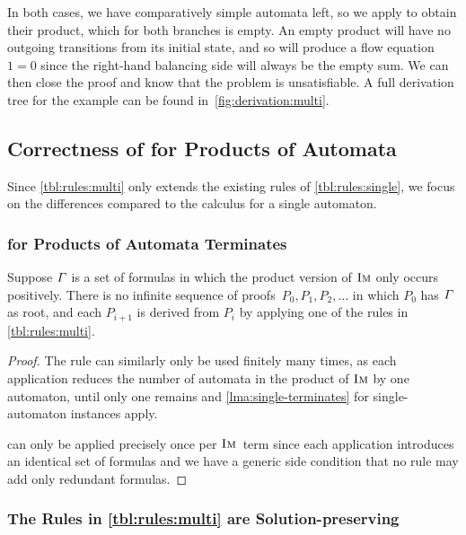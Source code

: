 In both cases, we have comparatively simple automata left, so we apply
\Materialise{} to obtain their product, which for both branches is empty. An
empty product will have no outgoing transitions from its initial state, and so
will produce a flow equation $1 = 0$ since the right-hand balancing side will
always be the empty sum. We can then close the proof and know that the problem
is unsatisfiable. A full derivation tree for the example can be found 
in~\cref{fig:derivation:multi}.


\subsection{Correctness of \Calculus{} for Products of Automata}

Since \cref{tbl:rules:multi} only extends the existing rules of
\cref{tbl:rules:single}, we focus on the differences compared
to the calculus for a single automaton.

\subsubsection{\Calculus{} for Products of Automata Terminates}
\begin{lemma}\label{lma:multi-terminates}
  Suppose $\varGamma{}$ is a set of formulas in which the product
  version of $\operatorname{\textsc{Im}}$ only occurs positively. There is no
  infinite sequence of proofs~$P_0, P_1, P_2, \ldots$ in which $P_0$
  has $\varGamma{}$ as root, and each $P_{i+1}$ is derived from
  $P_i$ by applying one of the rules in \cref{tbl:rules:multi}.
\end{lemma}

\begin{proof}
  The rule \Materialise{} can similarly only be used finitely many times, as
  each application reduces the number of automata in the product of $\operatorname{\textsc{Im}}$ by
  one automaton, until only one remains and \cref{lma:single-terminates} for
  single-automaton instances apply.
  
  \ExpandM{} can only be applied precisely once per $\operatorname{\textsc{Im}}$~term since
  each application introduces an identical set of formulas and we have a generic
  side condition that no rule may add only redundant formulas.
\end{proof}

\subsubsection{The Rules in \cref{tbl:rules:multi} are Solution-preserving}

